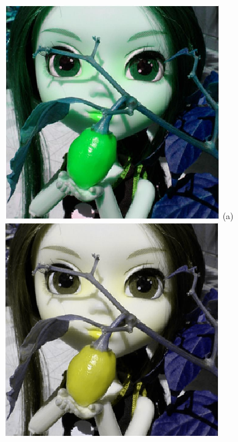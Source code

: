 \documentclass[	12pt, Times, openright, twoside, a4paper, english, brazil]{abntex2}
\begin{document}
\begin{figure}[!htb]
\centering
{\includegraphics[width=\linewidth]{figuraPimenta120.png}}
(a)
\endminipage\hfill
{}
\centering
{\includegraphics[width=\linewidth]{figuraPimenta120Protan.png}}

\end{figure}
\end{document}
